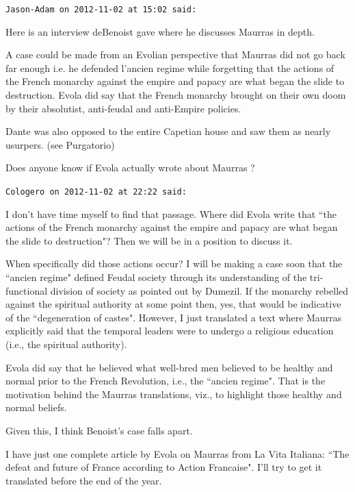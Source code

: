 \begin{footnotesize}\begin{sffamily}



\texttt{Jason-Adam on 2012-11-02 at 15:02 said: }

Here is an interview deBenoist gave where he discusses Maurras in depth.

A case could be made from an Evolian perspective that Maurras did not go back far enough i.e. he defended l'ancien regime while forgetting that the actions of the French monarchy against the empire and papacy are what began the slide to destruction. Evola did say that the French monarchy brought on their own doom by their absolutist, anti-feudal and anti-Empire policies. 

Dante was also opposed to the entire Capetian house and saw them as nearly usurpers. (see Purgatorio)

Does anyone know if Evola actually wrote about Maurras ?


\hfill

\texttt{Cologero on 2012-11-02 at 22:22 said: }

I don't have time myself to find that passage. Where did Evola write that ``the actions of the French monarchy against the empire and papacy are what began the slide to destruction"? Then we will be in a position to discuss it.

When specifically did those actions occur? I will be making a case soon that the ``ancien regime" defined Feudal society through its understanding of the tri-functional division of society as pointed out by Dumezil. If the monarchy rebelled against the spiritual authority at some point then, yes, that would be indicative of the ``degeneration of castes". However, I just translated a text where Maurras explicitly said that the temporal leaders were to undergo a religious education (i.e., the spiritual authority).

Evola did say that he believed what well-bred men believed to be healthy and normal prior to the French Revolution, i.e., the ``ancien regime". That is the motivation behind the Maurras translations, viz., to highlight those healthy and normal beliefs.

Given this, I think Benoist's case falls apart.

I have just one complete article by Evola on Maurras from La Vita Italiana: ``The defeat and future of France according to Action Francaise". I'll try to get it translated before the end of the year.


\end{sffamily}
\end{footnotesize}
